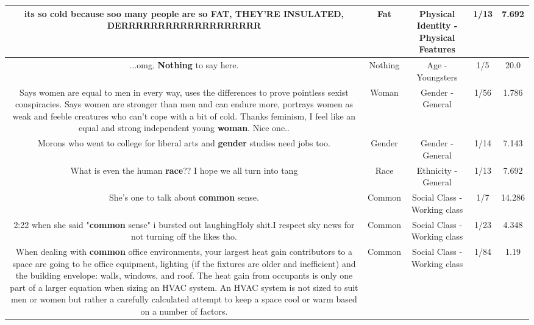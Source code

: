 \documentclass[11pt]{article}
\newlength\mylength
\begin{document}
\begin{center}
\begin{longtable}{|C{.65\mylength}|C{.30\mylength}|C{.12\mylength}|C{.12\mylength}|C{.12\mylength}|}
  \small its so cold because soo many people are so \textbf{FAT},  THEY'RE INSULATED, DERRRRRRRRRRRRRRRRRRR\normalsize   & Fat & Physical Identity - Physical Features & 1/13 & 7.692 \\  \hline
  \small ...omg. \textbf{Nothing} to say here.\normalsize   & Nothing & Age - Youngsters & 1/5 & 20.0 \\  \hline
  \small Says women are equal to men in every way, uses the differences to prove pointless sexist conspiracies. Says women are stronger than men and can endure more, portrays women as weak and feeble creatures who can't cope with a bit of cold. Thanks feminism, I feel like an equal and strong independent young \textbf{woman}. Nice one..\normalsize   & Woman & Gender - General & 1/56 & 1.786 \\  \hline
  \small Morons who went to college for liberal arts and \textbf{gender} studies need jobs too.\normalsize   & Gender & Gender - General & 1/14 & 7.143 \\  \hline
  \small What is even the human \textbf{race}?? I hope we all turn into tang\normalsize   & Race & Ethnicity - General & 1/13 & 7.692 \\  \hline
  \small She's one to talk about \textbf{common} sense.\normalsize   & Common & Social Class - Working class & 1/7 & 14.286 \\  \hline
  \small 2:22 when she said "\textbf{common} sense" i bursted out laughingHoly shit.I respect sky news for not turning off the likes tho.\normalsize   & Common & Social Class - Working class & 1/23 & 4.348 \\  \hline
  \small When dealing with \textbf{common} office environments, your largest heat gain contributors to a space are going to be office equipment, lighting (if the fixtures are older and inefficient) and the building envelope: walls, windows, and roof.  The heat gain from occupants is only one part of a larger equation when sizing an HVAC system. An HVAC system is not sized to suit men or women but rather a carefully calculated attempt to keep a space cool or warm based on a number of factors.\normalsize   & Common & Social Class - Working class & 1/84 & 1.19 \\  \hline

\end{longtable}
\end{center}
\end{document}
